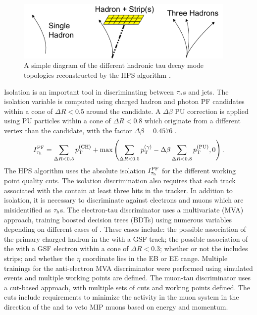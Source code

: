 \begin{figure}[hbt]
\begin{center}
\includegraphics[width=0.95\textwidth]{figures/DP2014_015-fig-mod.pdf}
\caption{A simple diagram of the different hadronic tau decay mode topologies reconstructed by the HPS algorithm \cite{CMS-DP-2014-015}.}
\label{fig:tau-modes}
\end{center}
\end{figure}

Isolation is an important tool in discriminating between $\tau_{\text{h}}$s and jets. The isolation variable is computed using charged hadron and photon PF candidates within a cone of $\Delta R < 0.5$ around the \tauh candidate. A $\Delta\beta$ PU correction is applied using PU particles within a cone of $\Delta R < 0.8$ which originate from a different vertex than the \tauh candidate, with the factor $\Delta\beta = 0.4576$ \cite{CMS-DP-2014-015}.
\begin{equation}
I^{\text{PF}}_{\tau_{\text{h}}} = \sum_{\Delta R < 0.5}{p_{\mathrm{T}}^{(\text{CH})}} + \text{max}\left( \sum_{\Delta R < 0.5}{p_{\mathrm{T}}^{(\gamma)}} - \Delta\beta \sum_{\Delta R < 0.8}{p_{\mathrm{T}}^{(\text{PU})}}, 0 \right).
\end{equation}
The HPS algorithm uses the absolute isolation $I^{\text{PF}}_{\tau_{\text{h}}}$ for the different working point quality cuts. The isolation discrimination also requires that each track associated with the \tauh contain at least three hits in the tracker. In addition to isolation, it is necessary to discriminate against electrons and muons which are misidentified as $\tau_{\text{h}}$s. The electron-tau discriminator uses a multivariate (MVA) approach, training boosted decision trees (BDTs) using numerous variables depending on different cases of \tauh. These cases include: the possible association of the primary charged hadron in the \tauh with a GSF track; the possible association of the \tauh with a GSF electron within a cone of $\Delta R < 0.3$; whether or not the \tauh includes strips; and whether the \tauh $\eta$ coordinate lies in the EB or EE range. Multiple trainings for the anti-electron MVA discriminator were performed using simulated events and multiple working points are defined. The muon-tau discriminator uses a cut-based approach, with multiple sets of cuts and working points defined. The cuts include requirements to minimize the activity in the muon system in the direction of the \tauh and to veto MIP muons based on energy and momentum. 

